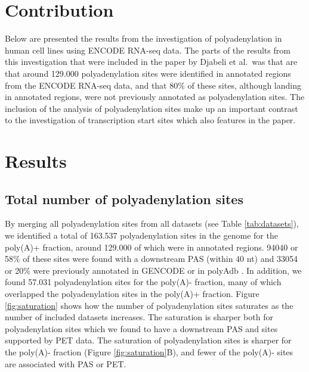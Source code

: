 \section{Contribution}
Below are presented the results from the investigation of polyadenylation in
human cell lines using ENCODE RNA-seq data. The parts of the results from this
investigation that were included in the paper by Djabeli et al.\ was that are
that around 129.000 polyadenylation sites were identified in annotated regions
from the ENCODE RNA-seq data, and that 80\% of these sites, although landing
in annotated regions, were not previously annotated as polyadenylation sites.
The inclusion of the analysis of polyadenylation sites make up an important
contrast to the investigation of transcription start sites which also features
in the paper.

\section{Results}

\subsection{Total number of polyadenylation sites}
By merging all polyadenylation sites from all datasets (see Table
\ref{tab:datasets}), we identified a total of 163.537 polyadenylation sites in
the genome for the poly(A)+ fraction, around 129.000 of which were in annotated
regions. 94040 or 58\% of these sites were found with a downstream PAS (within
40 nt) and 33054 or 20\% were previously annotated in GENCODE
\cite{harrow_gencode:_2012-1} or in polyAdb \cite{lee_polyadb_2007}. In
addition, we found 57.031 polyadenylation sites for the poly(A)- fraction, many
of which overlapped the polyadenylation sites in the poly(A)+ fraction. Figure
\ref{fig:saturation} shows how the number of polyadenylation sites saturates as
the number of included datasets increases.  The saturation is sharper both for
polyadenylation sites which we found to have a downstream PAS and sites
supported by PET data. The saturation of polyadenylation sites is sharper for
the poly(A)- fraction (Figure \ref{fig:saturation}B), and fewer of the poly(A)-
sites are associated with PAS or PET.

